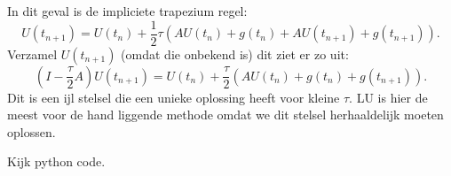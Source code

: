 \documentclass{article}
\begin{document}
In dit geval is de impliciete trapezium regel:
\[
  U(t_{n+1}) = U(t_{n}) + \frac{1}{2} \tau (A U(t_{n}) + g(t_{n}) + A U(t_{n+1}) + g(t_{n+1}))
.\]
Verzamel $U(t_{n+1})$ (omdat die onbekend is) dit ziet er zo uit:
\[
  (I-\frac{\tau}{2}A)U(t_{n+1}) = U(t_{n}) + \frac{\tau}{2} (AU(t_{n}) + g(t_{n})+ g(t_{n+1}))
.\]
Dit is een ijl stelsel die een unieke oplossing heeft voor kleine $\tau$.
LU is hier de meest voor de hand liggende methode omdat we dit stelsel
herhaaldelijk moeten oplossen.

Kijk python code.
\end{document}
